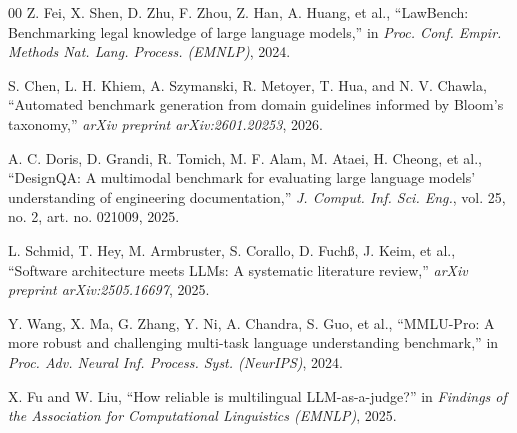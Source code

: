 \documentclass[conference]{IEEEtran}
\begin{document}
\begin{thebibliography}{00}
 Z. Fei, X. Shen, D. Zhu, F. Zhou, Z. Han, A. Huang, et al., ``LawBench: Benchmarking legal knowledge of large language models,'' in \textit{Proc. Conf. Empir. Methods Nat. Lang. Process. (EMNLP)}, 2024.

 S. Chen, L. H. Khiem, A. Szymanski, R. Metoyer, T. Hua, and N. V. Chawla, ``Automated benchmark generation from domain guidelines informed by Bloom's taxonomy,'' \textit{arXiv preprint arXiv:2601.20253}, 2026.

 A. C. Doris, D. Grandi, R. Tomich, M. F. Alam, M. Ataei, H. Cheong, et al., ``DesignQA: A multimodal benchmark for evaluating large language models' understanding of engineering documentation,'' \textit{J. Comput. Inf. Sci. Eng.}, vol. 25, no. 2, art. no. 021009, 2025.

 L. Schmid, T. Hey, M. Armbruster, S. Corallo, D. Fuch{\ss}, J. Keim, et al., ``Software architecture meets LLMs: A systematic literature review,'' \textit{arXiv preprint arXiv:2505.16697}, 2025.

 Y. Wang, X. Ma, G. Zhang, Y. Ni, A. Chandra, S. Guo, et al., ``MMLU-Pro: A more robust and challenging multi-task language understanding benchmark,'' in \textit{Proc. Adv. Neural Inf. Process. Syst. (NeurIPS)}, 2024.

 X. Fu and W. Liu, ``How reliable is multilingual LLM-as-a-judge?'' in \textit{Findings of the Association for Computational Linguistics (EMNLP)}, 2025.
\end{thebibliography}
\end{document}
